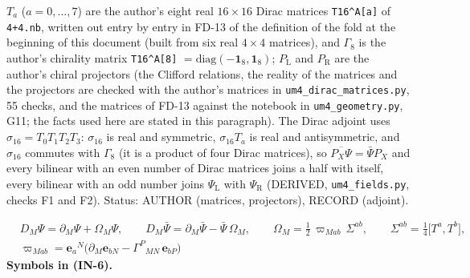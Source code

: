 \documentclass[
  10pt,
]{article}
\begin{document}
\(T_a\) (\(a = 0, \dots, 7\)) are the author's eight real
\(16 \times 16\) Dirac matrices \texttt{T16\^{}A{[}a{]}} of
\texttt{4+4.nb}, written out entry by entry in FD-13 of the definition
of the fold at the beginning of this document (built from six real
\(4 \times 4\) matrices), and \(\Gamma_8\) is the author's chirality
matrix \texttt{T16\^{}A{[}8{]}}
\(= \mathrm{diag}(-\mathbf{1}_8, \mathbf{1}_8)\); \(P_{\mathrm{L}}\) and
\(P_{\mathrm{R}}\) are the author's chiral projectors (the Clifford
relations, the reality of the matrices and the projectors are checked
with the author's matrices in \texttt{um4\_dirac\_matrices.py}, 55
checks, and the matrices of FD-13 against the notebook in
\texttt{um4\_geometry.py}, G11; the facts used here are stated in this
paragraph). The Dirac adjoint uses \(\sigma_{16} = T_0T_1T_2T_3\):
\(\sigma_{16}\) is real and symmetric, \(\sigma_{16}T_a\) is real and
antisymmetric, and \(\sigma_{16}\) commutes with \(\Gamma_8\) (it is a
product of four Dirac matrices), so
\(\overline{P_X\Psi} = \bar\Psi P_X\) and every bilinear with an even
number of Dirac matrices joins a half with itself, every bilinear with
an odd number joins \(\Psi_{\mathrm{L}}\) with \(\Psi_{\mathrm{R}}\)
(DERIVED, \texttt{um4\_fields.py}, checks F1 and F2). Status: AUTHOR
(matrices, projectors), RECORD (adjoint).

\[
\begin{aligned}
&D_M\Psi = \partial_M\Psi + \Omega_M\Psi,\qquad D_M\bar\Psi = \partial_M\bar\Psi - \bar\Psi\,\Omega_M,\qquad
 \Omega_M = \frac12\,\varpi_{Mab}\,\Sigma^{ab},\qquad \Sigma^{ab} = \frac14\big[T^a, T^b\big],\\
&\varpi_{Mab} = \mathbf{e}_a{}^N\big(\partial_M\mathbf{e}_{bN} - \Gamma^P{}_{MN}\,\mathbf{e}_{bP}\big)
\end{aligned} \tag{IN-6}
\] \textbf{Symbols in (IN-6).}
\end{document}
